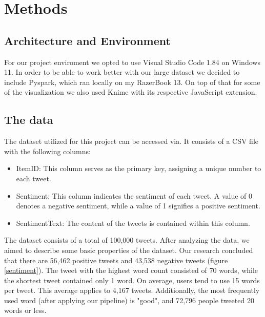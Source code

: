 \documentclass[11pt,a4paper]{article}
\begin{document}
\section{Methods}
\subsection{Architecture and Environment}
For our project enviroment we opted to use Visual Studio Code 1.84 on Windows 11. In order to be able to work better with our large dataset we decided to include Pyspark, which ran locally on my RazerBook 13. On top of that for some of the visualization we also used Knime with its respective JavaScript extension.
\subsection{The data}
The dataset utilized for this project can be accessed via. 
It consists of a CSV file with the following columns:
\begin{itemize}
\item ItemID: This column serves as the primary key, assigning a unique number to each tweet.
\item Sentiment: This column indicates the sentiment of each tweet. A value of 0 denotes a negative sentiment, while a value of 1 signifies a positive sentiment.
\item SentimentText: The content of the tweets is contained within this column.
\end{itemize}
The dataset consists of a total of 100,000 tweets. After analyzing the data, we aimed to describe some basic properties of the dataset. Our research concluded that there are 56,462 positive tweets and 43,538 negative tweets (figure \ref{sentiment}). The tweet with the highest word count consisted of 70 words, while the shortest tweet contained only 1 word. On average, users tend to use 15 words per tweet. This average applies to 4,167 tweets. Additionally, the most frequently used word (after applying our pipeline) is "good", and 72,796 people tweeted 20 words or less.
\end{document}
